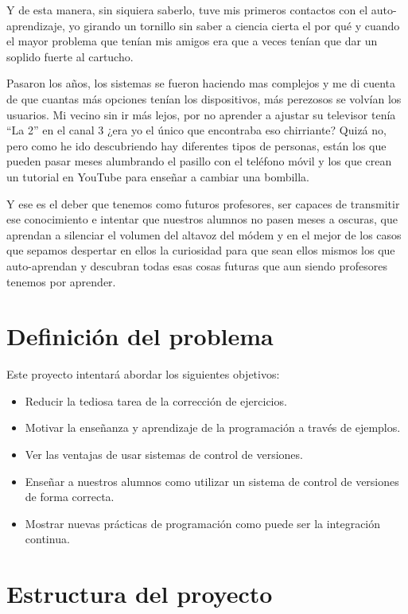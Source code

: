 \bigskip
Y de esta manera, sin siquiera saberlo, tuve mis primeros contactos con el auto-aprendizaje, yo girando un tornillo sin saber a ciencia cierta el por qué y cuando el mayor problema que tenían mis amigos era que a veces tenían que dar un soplido fuerte al cartucho.

\bigskip
Pasaron los años, los sistemas se fueron haciendo mas complejos y me di cuenta de que cuantas más opciones tenían los dispositivos, más perezosos se volvían los usuarios. Mi vecino sin ir más lejos, por no aprender a ajustar su televisor tenía ``La 2'' en el canal 3 ¿era yo el único que encontraba eso chirriante? Quizá no, pero como he ido descubriendo hay diferentes tipos de personas, están los que pueden pasar meses alumbrando el pasillo con el teléfono móvil y los que crean un tutorial en YouTube para enseñar a cambiar una bombilla.

\bigskip
Y ese es el deber que tenemos como futuros profesores, ser capaces de transmitir ese conocimiento e intentar que nuestros alumnos no pasen meses a oscuras, que aprendan a silenciar el volumen del altavoz del módem y en el mejor de los casos que sepamos despertar en ellos la curiosidad para que sean ellos mismos los que auto-aprendan y descubran todas esas cosas futuras que aun siendo profesores tenemos por aprender.

\section{Definición del problema}

Este proyecto intentará abordar los siguientes objetivos:

\begin{itemize}
  \item Reducir la tediosa tarea de la corrección de ejercicios.
  \item Motivar la enseñanza y aprendizaje de la programación a través de ejemplos.
  \item Ver las ventajas de usar sistemas de control de versiones.
  \item Enseñar a nuestros alumnos como utilizar un sistema de control de versiones de forma correcta.
  \item Mostrar nuevas prácticas de programación como puede ser la integración continua.
\end{itemize}

\section{Estructura del proyecto}


